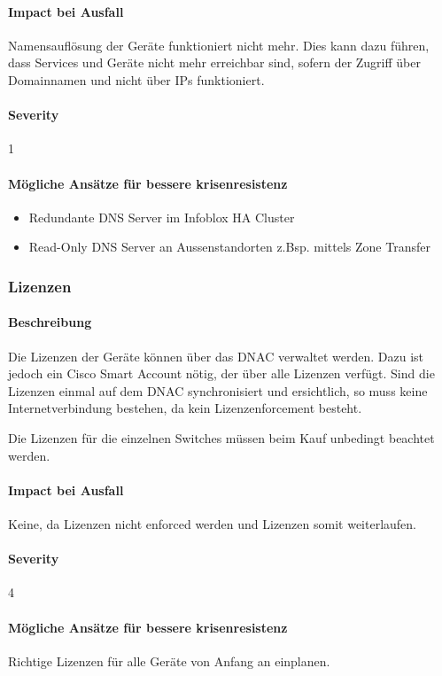 \paragraph{Impact bei Ausfall}
Namensauflösung der Geräte funktioniert nicht mehr. Dies kann dazu führen, dass Services und Geräte nicht mehr erreichbar sind, sofern der Zugriff über Domainnamen und nicht über IPs funktioniert.

\paragraph{Severity} 1

\paragraph{Mögliche Ansätze für bessere krisenresistenz}
\begin{itemize}
	\item Redundante DNS Server im Infoblox HA Cluster
	\item Read-Only DNS Server an Aussenstandorten z.Bsp. mittels Zone Transfer
\end{itemize}

\subsubsection{Lizenzen}
\paragraph{Beschreibung}
Die Lizenzen der Geräte können über das DNAC verwaltet werden. Dazu ist jedoch ein Cisco Smart Account nötig, der über alle Lizenzen verfügt. Sind die Lizenzen einmal auf dem DNAC synchronisiert und ersichtlich, so muss keine Internetverbindung bestehen, da kein Lizenzenforcement besteht.

Die Lizenzen für die einzelnen Switches müssen beim Kauf unbedingt beachtet werden.

\paragraph{Impact bei Ausfall}
Keine, da Lizenzen nicht enforced werden und Lizenzen somit weiterlaufen.

\paragraph{Severity} 4

\paragraph{Mögliche Ansätze für bessere krisenresistenz}
Richtige Lizenzen für alle Geräte von Anfang an einplanen.

